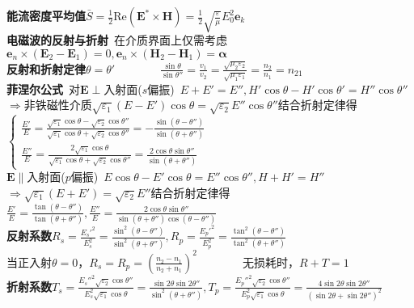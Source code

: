 \documentclass[10pt,a4paper]{article}
\begin{document}
\begin{multicols}{2}
\textbf{能流密度平均值}$\bar{S}=\frac{1}{2}\text{Re}(\bm{E}^*\times\bm{H})=\frac{1}{2}\sqrt{\frac{\varepsilon}{\mu}}E_0^2\bm{e}_k$\\
\textbf{电磁波的反射与折射}~在介质界面上仅需考虑$\bm{e}_n\times(\bm{E}_2-\bm{E}_1)=0,\bm{e}_n\times(\bm{H}_2-\bm{H}_1)=\bm{\alpha}$\\
\textbf{反射和折射定律}$\theta=\theta'$~~~~~~~~$\frac{\sin\theta}{\sin\theta''}=\frac{v_1}{v_2}=\frac{\sqrt{\mu_2\varepsilon_2}}{\sqrt{\mu_1\varepsilon_1}}=\frac{n_2}{n_1}=n_{21}$\\
\textbf{菲涅尔公式}~对$\bm{E}\perp$入射面($s$偏振)~$E+E'=E'',H'\cos\theta-H'\cos\theta'=H''\cos\theta''$\\
\indent\indent$\Rightarrow\text{非铁磁性介质}\sqrt{\varepsilon_1}(E-E')\cos\theta=\sqrt{\varepsilon_2}E''\cos\theta''$结合折射定律得\\
\indent\indent$\left\{\begin{array}{l}\frac{E'}{E}=\frac{\sqrt{\varepsilon_1}\cos\theta-\sqrt{\varepsilon_2}\cos\theta''}{\sqrt{\varepsilon_1}\cos\theta+\sqrt{\varepsilon_2}\cos\theta''}=-\frac{\sin(\theta-\theta'')}{\sin(\theta+\theta'')}\\\frac{E''}{E}=\frac{2\sqrt{\varepsilon_1}\cos\theta}{\sqrt{\varepsilon_1}\cos\theta+\sqrt{\varepsilon_2}\cos\theta''}=\frac{2\cos\theta\sin\theta''}{\sin(\theta+\theta'')}\end{array}\right.$\\
$\bm{E}\parallel$入射面($p$偏振)~$E\cos\theta-E'\cos\theta=E''\cos\theta'',H+H'=H''$\\
\indent\indent$\Rightarrow\sqrt{\varepsilon_1}(E+E')=\sqrt{\varepsilon_2}E''$结合折射定律得\\
\indent\indent$\frac{E'}{E}=\frac{\tan(\theta-\theta'')}{\tan(\theta+\theta'')},\frac{E''}{E}=\frac{2\cos\theta\sin\theta''}{\sin(\theta+\theta'')\cos(\theta-\theta'')}$\\
\textbf{反射系数}$R_s=\frac{E_s'^2}{E_s^2}=\frac{\sin^2(\theta-\theta'')}{\sin^2(\theta+\theta'')},R_p=\frac{E_p'^2}{E_p^2}=\frac{\tan^2(\theta-\theta'')}{\tan^2(\theta+\theta'')}$\\
当正入射$\theta=0$，$R_s=R_p=(\frac{n_2-n_1}{n_2+n_1})^2$~~~~~~~~无损耗时，$R+T=1$\\
\tiny\textbf{折射系数}\scriptsize$T_s=\frac{E_s''^2\sqrt{\varepsilon_2}\cos\theta''}{E_s^2\sqrt{\varepsilon_1}\cos\theta}=\frac{\sin2\theta\sin2\theta''}{\sin^2(\theta+\theta'')},T_p=\frac{E_p''^2\sqrt{\varepsilon_2}\cos\theta''}{E_p^2\sqrt{\varepsilon_1}\cos\theta}=\frac{4\sin2\theta\sin2\theta''}{(\sin2\theta+\sin2\theta'')^2}$\\

\end{multicols}
\end{document}
